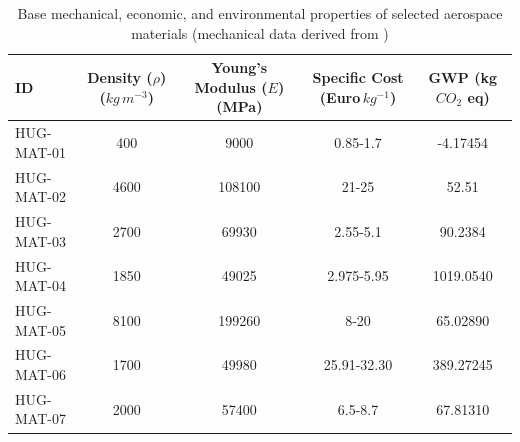\begin{table}[H]
\centering
\caption{Base mechanical, economic, and environmental properties of selected aerospace materials (mechanical data derived from \cite{Mouritz2012})}
\label{tab:base-material-properties}
\renewcommand{\arraystretch}{1.2}
\begin{tabular}{|l|c|c|c|c|}
\hline
\textbf{ID}
  & \makecell{\textbf{Density} ($\rho$)\\($kg\,m^{-3}$)}
  & \makecell{\textbf{Young's}\\\textbf{Modulus} ($E$)\\(MPa)}
  & \makecell{\textbf{Specific}\\\textbf{Cost}\\(Euro\,$kg^{-1}$)} 
  & \makecell{\textbf{GWP}\\(kg $CO_2$ eq)} \\
  
\hline\hline

HUG-MAT-01 & 400  & 9000   & 0.85-1.7 & -4.17454
\\ \hline

HUG-MAT-02 & 4600 & 108100 & 21-25 & 52.51
\\ \hline

HUG-MAT-03 & 2700 & 69930  & 2.55-5.1 & 90.2384
\\ \hline

HUG-MAT-04 & 1850 & 49025  & 2.975-5.95 & 1019.0540
\\ \hline

HUG-MAT-05 & 8100 & 199260 & 8-20 & 65.02890
\\ \hline

HUG-MAT-06 & 1700 & 49980  & 25.91-32.30 & 389.27245
\\ \hline

HUG-MAT-07 & 2000 & 57400  & 6.5-8.7 & 67.81310
\\ \hline
\end{tabular}
\end{table}



